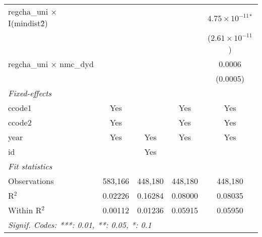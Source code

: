\begin{tabular}{lcccc}
   regcha\_uni $\times$ I(mindist\^2)    &                &                         &                                & $4.75\times 10^{-11}$$^{*}$\\    
                                         &                &                         &                                & ($2.61\times 10^{-11}$)\\    
   regcha\_uni $\times$ nmc\_dyd         &                &                         &                                & 0.0006\\   
                                         &                &                         &                                & (0.0005)\\   
   \midrule
   \emph{Fixed-effects}\\
   ccode1                                & Yes            &                         & Yes                            & Yes\\  
   ccode2                                & Yes            &                         & Yes                            & Yes\\  
   year                                  & Yes            & Yes                     & Yes                            & Yes\\  
   id                                    &                & Yes                     &                                & \\  
   \midrule
   \emph{Fit statistics}\\
   Observations                          & 583,166        & 448,180                 & 448,180                        & 448,180\\  
   R$^2$                                 & 0.02226        & 0.16284                 & 0.08000                        & 0.08035\\  
   Within R$^2$                          & 0.00112        & 0.01236                 & 0.05915                        & 0.05950\\  
   \midrule \midrule
   \multicolumn{5}{l}{\emph{Signif. Codes: ***: 0.01, **: 0.05, *: 0.1}}\\
\end{tabular}
\par\endgroup


